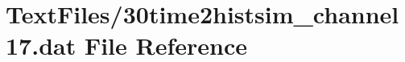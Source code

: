 \hypertarget{30time2histsim__channel17_8dat}{}\section{Text\+Files/30time2histsim\+\_\+channel17.dat File Reference}
\label{30time2histsim__channel17_8dat}
